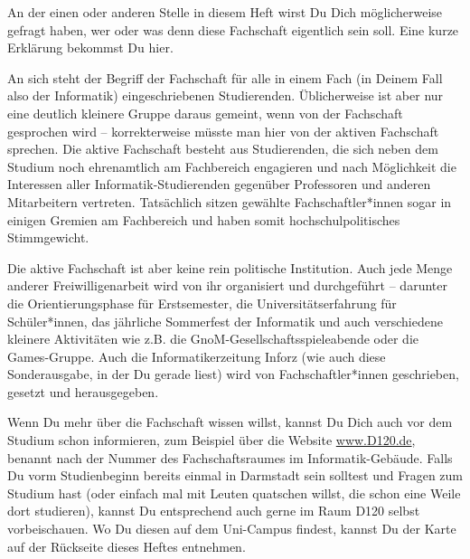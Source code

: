 {An der einen oder anderen Stelle in diesem Heft wirst Du Dich möglicherweise gefragt haben, wer oder was denn diese Fachschaft eigentlich sein soll. Eine kurze Erklärung bekommst Du hier.%
}
{An sich steht der Begriff der Fachschaft für alle in einem Fach (in Deinem Fall also der Informatik) eingeschriebenen Studierenden. Üblicherweise ist aber nur eine deutlich kleinere Gruppe daraus gemeint, wenn von der Fachschaft gesprochen wird – korrekterweise müsste man hier von der aktiven Fachschaft sprechen. Die aktive Fachschaft besteht aus Studierenden, die sich neben dem Studium noch ehrenamtlich am Fachbereich engagieren und nach Möglichkeit die Interessen aller Informatik-Studierenden gegenüber Professoren und anderen Mitarbeitern vertreten. Tatsächlich sitzen gewählte Fachschaftler*innen sogar in einigen Gremien am Fachbereich und haben somit hochschulpolitisches Stimmgewicht.

    Die aktive Fachschaft ist aber keine rein politische Institution. Auch jede Menge anderer Freiwilligenarbeit wird von ihr organisiert und durchgeführt – darunter die Orientierungsphase für Erstsemester, die Universitätserfahrung für Schüler*innen, das jährliche Sommerfest der Informatik und auch verschiedene kleinere Aktivitäten wie z.B. die GnoM-Gesellschaftsspieleabende oder die Games-Gruppe. Auch die Informatikerzeitung Inforz (wie auch diese Sonderausgabe, in der Du gerade liest) wird von Fachschaftler*innen geschrieben, gesetzt und herausgegeben.

    Wenn Du mehr über die Fachschaft wissen willst, kannst Du Dich auch vor dem Studium schon informieren, zum Beispiel über die Website \url{www.D120.de}, benannt nach der Nummer des Fachschaftsraumes im Informatik-Gebäude. Falls Du vorm Studienbeginn bereits einmal in Darmstadt sein solltest und Fragen zum Studium hast (oder einfach mal mit Leuten quatschen willst, die schon eine Weile dort studieren), kannst Du entsprechend auch gerne im Raum D120 selbst vorbeischauen. Wo Du diesen auf dem Uni-Campus findest, kannst Du der Karte auf der Rückseite dieses Heftes entnehmen.
}
{}

\vfill
{}
\vfill

\newpage
